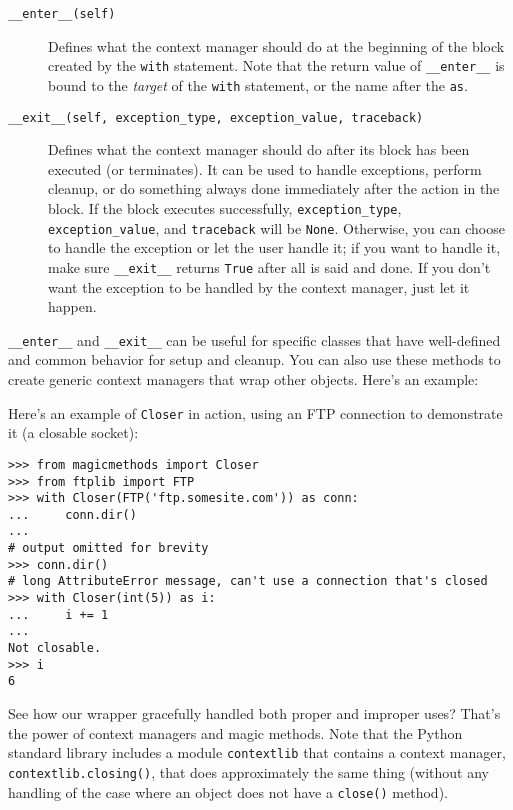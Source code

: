 \documentclass[a4paper,11pt]{article}
\newcommand{\code}[1]{\texttt{#1}}
\begin{document}
\begin{description}

\item[\code{__enter__(self)}]
Defines what the context manager should do at the beginning of the block created by the \code{with} statement. Note that the return value of \code{__enter__} is bound to the \emph{target} of the \code{with} statement, or the name after the \code{as}.
\item[\code{__exit__(self, exception_type, exception_value, traceback)}]
Defines what the context manager should do after its block has been executed (or terminates). It can be used to handle exceptions, perform cleanup, or do something always done immediately after the action in the block. If the block executes successfully, \code{exception_type}, \code{exception_value}, and \code{traceback} will be \code{None}. Otherwise, you can choose to handle the exception or let the user handle it; if you want to handle it, make sure \code{__exit__} returns \code{True} after all is said and done. If you don't want the exception to be handled by the context manager, just let it happen.

\end{description}

\code{__enter__} and \code{__exit__} can be useful for specific classes that have well-defined and common behavior for setup and cleanup. You can also use these methods to create generic context managers that wrap other objects. Here's an example:



\noindent
Here's an example of \code{Closer} in action, using an FTP connection to demonstrate it (a closable socket):

\begin{lstlisting}
>>> from magicmethods import Closer
>>> from ftplib import FTP
>>> with Closer(FTP('ftp.somesite.com')) as conn:
...     conn.dir()
...
# output omitted for brevity
>>> conn.dir()
# long AttributeError message, can't use a connection that's closed
>>> with Closer(int(5)) as i:
...     i += 1
...
Not closable.
>>> i
6
\end{lstlisting}

\noindent
See how our wrapper gracefully handled both proper and improper uses? That's the power of context managers and magic methods. Note that the Python standard library includes a module \code{contextlib} that contains a context manager, \code{contextlib.closing()}, that does approximately the same thing (without any handling of the case where an object does not have a \code{close()} method).
\end{document}
